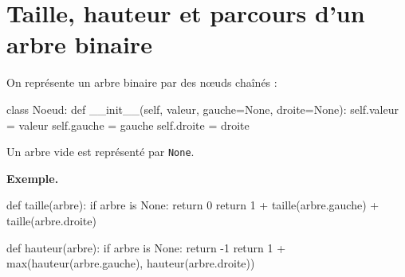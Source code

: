 
\section{Taille, hauteur et parcours d'un arbre binaire}


On représente un arbre binaire par des nœuds chaînés :
\begin{python}
class Noeud:
    def __init__(self, valeur, gauche=None, droite=None):
        self.valeur = valeur
        self.gauche = gauche
        self.droite = droite
\end{python}
Un arbre vide est représenté par \lstinline{None}.



\textbf{Exemple.}
\begin{python}
def taille(arbre):
    if arbre is None:
        return 0
    return 1 + taille(arbre.gauche) + taille(arbre.droite)

def hauteur(arbre):
    if arbre is None:
        return -1
    return 1 + max(hauteur(arbre.gauche), hauteur(arbre.droite))
\end{python}

%
%
%

